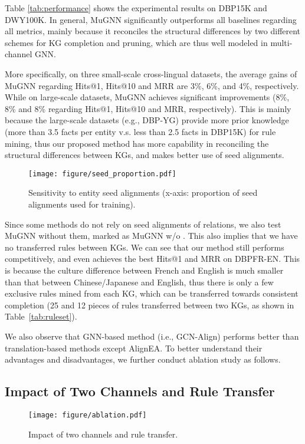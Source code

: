 \documentclass[11pt,a4paper]{article}
\begin{document}
Table \ref{tab:performance} shows the experimental results on DBP15K and DWY100K. In general, MuGNN significantly outperforms all baselines regarding all metrics, mainly because it reconciles the structural differences by two different schemes for KG completion and pruning, which are thus well modeled in multi-channel GNN.

More specifically, on three small-scale cross-lingual datasets, the average gains of MuGNN regarding Hits@1, Hits@10 and MRR are 3\%, 6\%, and 4\%, respectively. While on large-scale datasets, MuGNN achieves significant improvements (8\%, 8\% and 8\% regarding Hits@1, Hits@10 and MRR, respectively). This is mainly because the large-scale datasets (e.g., DBP-YG) provide more prior knowledge (more than 3.5 facts per entity v.s. less than 2.5 facts in DBP15K) for rule mining, thus our proposed method has more capability in reconciling the structural differences between KGs, and makes better use of seed alignments.

\begin{figure*}[htb]
	\centerline{\texttt{[image: figure/seed\_proportion.pdf]}}
	\caption{Sensitivity to entity seed alignments (x-axis: proportion of seed alignments used for training).}
	\label{fig:seed}
\end{figure*}

Since some methods do not rely on seed alignments of relations, we also test MuGNN without them, marked as MuGNN w/o . This also implies that we have no transferred rules between KGs. We can see that our method still performs competitively, and even achieves the best Hits@1 and MRR on {DBP\tiny{FR-EN}}. This is because the culture difference between French and English is much smaller than that between Chinese/Japanese and English, thus there is only a few exclusive rules mined from each KG, which can be transferred towards consistent completion (25 and 12 pieces of rules transferred between two KGs, as shown in Table~\ref{tab:ruleset}).

We also observe that GNN-based method (i.e., GCN-Align) performs better than translation-based methods except AlignEA. To better understand their advantages and disadvantages, we further conduct ablation study as follows.

\subsection{Impact of Two Channels and Rule Transfer}

\begin{figure}[htb]
	\centerline{\texttt{[image: figure/ablation.pdf]}}
	\caption{Impact of two channels and rule transfer.}
	\label{fig:ablation}
\end{figure}
\end{document}
